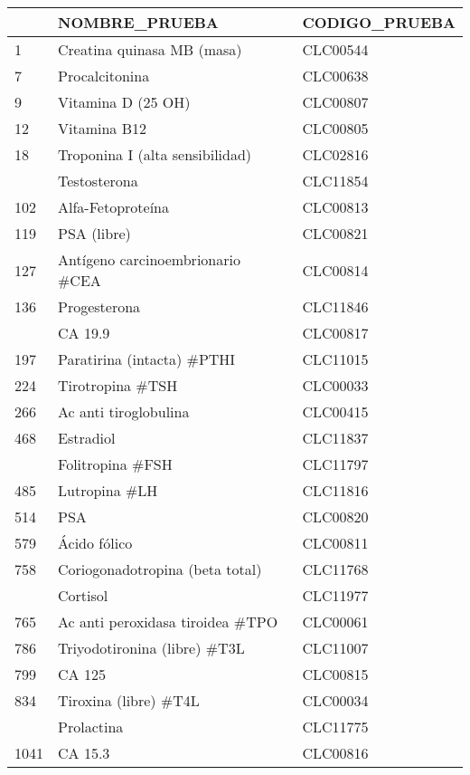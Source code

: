 
\begin{tabular}{lll}
\toprule
  & NOMBRE\_PRUEBA & CODIGO\_PRUEBA\\
\midrule
1 & Creatina quinasa MB (masa) & CLC00544\\
7 & Procalcitonina & CLC00638\\
9 & Vitamina D (25 OH) & CLC00807\\
12 & Vitamina B12 & CLC00805\\
18 & Troponina I (alta sensibilidad) & CLC02816\\
\addlinespace
95 & Testosterona & CLC11854\\
102 & Alfa-Fetoproteína & CLC00813\\
119 & PSA (libre) & CLC00821\\
127 & Antígeno carcinoembrionario \#CEA & CLC00814\\
136 & Progesterona & CLC11846\\
\addlinespace
144 & CA 19.9 & CLC00817\\
197 & Paratirina (intacta) \#PTHI & CLC11015\\
224 & Tirotropina \#TSH & CLC00033\\
266 & Ac anti tiroglobulina & CLC00415\\
468 & Estradiol & CLC11837\\
\addlinespace
474 & Folitropina \#FSH & CLC11797\\
485 & Lutropina \#LH & CLC11816\\
514 & PSA & CLC00820\\
579 & Ácido fólico & CLC00811\\
758 & Coriogonadotropina (beta total) & CLC11768\\
\addlinespace
764 & Cortisol & CLC11977\\
765 & Ac anti peroxidasa tiroidea \#TPO & CLC00061\\
786 & Triyodotironina (libre) \#T3L & CLC11007\\
799 & CA 125 & CLC00815\\
834 & Tiroxina (libre) \#T4L & CLC00034\\
\addlinespace
897 & Prolactina & CLC11775\\
1041 & CA 15.3 & CLC00816\\
\bottomrule
\end{tabular}
